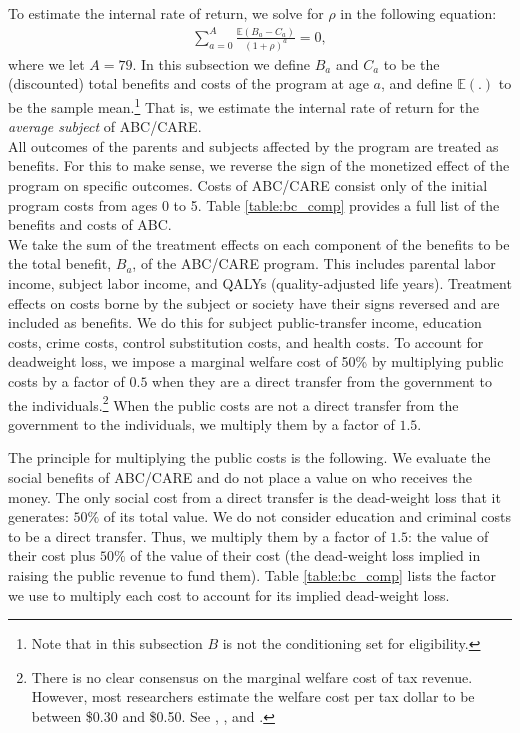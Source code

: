 \noindent To estimate the internal rate of return, we solve for $\rho$ in the following equation:
\begin{align}
\sum_{a=0}^A \frac{ \mathbb{E} (B_a - C_a)}{(1+\rho)^a} = 0,
\end{align}
where we let $A = 79$. In this subsection we define $B_a$ and $C_a$ to be the (discounted) total benefits and costs of the program at age $a$, and define $\mathbb{E}(.)$ to be the sample mean.\footnote{Note that in this subsection $B$ is not the conditioning set for eligibility.} That is, we estimate the internal rate of return for the \textit{average subject} of ABC/CARE. \\

\noindent All outcomes of the parents and subjects affected by the program are treated as benefits. For this to make sense, we reverse the sign of the monetized effect of the program on specific outcomes. Costs of ABC/CARE consist only of the initial program costs from ages 0 to 5. Table \ref{table:bc_comp} provides a full list of the benefits and costs of ABC. \\

\noindent We take the sum of the treatment effects on each component of the benefits to be the total benefit, $B_a$, of the ABC/CARE program. This includes parental labor income, subject labor income, and QALYs (quality-adjusted life years). Treatment effects on costs borne by the subject or society have their signs reversed and are included as benefits. We do this for subject public-transfer income, education costs, crime costs, control substitution costs, and health costs. To account for deadweight loss, we impose a marginal welfare cost of 50\% by multiplying public costs by a factor of $0.5$ when they are a direct transfer from the government to the individuals.\footnote{There is no clear consensus on the marginal welfare cost of tax revenue. However, most researchers estimate the welfare cost per tax dollar to be between \$0.30 and \$0.50. See \citet{Feldstein_1999_REStat}, \citet{Heckman_Smith_1998_evaluating}, and \citet{Browning_1987_AER}.} When the public costs are not a direct transfer from the government to the individuals, we multiply them by a factor of $1.5$.

\noindent The principle for multiplying the public costs is the following. We evaluate the social benefits of ABC/CARE and do not place a value on who receives the money. The only social cost from a direct transfer is the dead-weight loss that it generates: $50\%$ of its total value. We do not consider education and criminal costs to be a direct transfer. Thus, we multiply them by a factor of $1.5$: the value of their cost plus $50\%$ of the value of their cost (the dead-weight loss implied in raising the public revenue to fund them). Table \ref{table:bc_comp} lists the factor we use to multiply each cost to account for its implied dead-weight loss.

